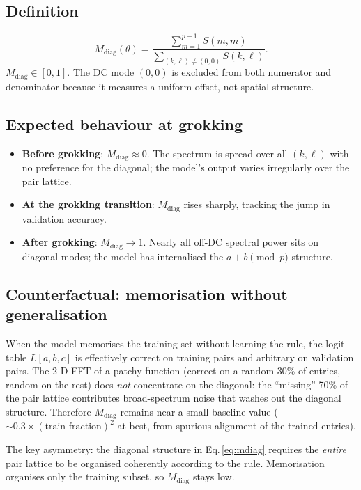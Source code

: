 \documentclass[11pt]{article}
\newcommand{\diag}{\mathrm{diag}}
\begin{document}
\subsection{Definition}

\begin{equation}
    M_{\diag}(\theta)
    = \frac{\displaystyle\sum_{m=1}^{p-1} S(m,m)}
           {\displaystyle\sum_{(k,\ell)\neq(0,0)} S(k,\ell)}.
    \label{eq:mdiag}
\end{equation}
$M_{\diag}\in[0,1]$.
The DC mode $(0,0)$ is excluded from both numerator and denominator because it
measures a uniform offset, not spatial structure.

\subsection{Expected behaviour at grokking}

\begin{itemize}
    \item \textbf{Before grokking}: $M_{\diag}\approx 0$.
    The spectrum is spread over all $(k,\ell)$ with no preference for the
    diagonal; the model's output varies irregularly over the pair lattice.
    \item \textbf{At the grokking transition}: $M_{\diag}$ rises sharply,
    tracking the jump in validation accuracy.
    \item \textbf{After grokking}: $M_{\diag}\to 1$.
    Nearly all off-DC spectral power sits on diagonal modes; the model has
    internalised the $a+b \pmod{p}$ structure.
\end{itemize}

\subsection{Counterfactual: memorisation without generalisation}

When the model memorises the training set without learning the rule,
the logit table $L[a,b,c]$ is effectively correct on training pairs and
arbitrary on validation pairs.
The 2-D FFT of a patchy function (correct on a random 30\% of entries,
random on the rest) does \emph{not} concentrate on the diagonal: the
``missing'' 70\% of the pair lattice contributes broad-spectrum noise that
washes out the diagonal structure.
Therefore $M_{\diag}$ remains near a small baseline value ($\sim 0.3 \times
(\text{train fraction})^2$ at best, from spurious alignment of the trained
entries).

The key asymmetry: the diagonal structure in Eq.\,\eqref{eq:mdiag} requires
the \emph{entire} pair lattice to be organised coherently according to the
rule.
Memorisation organises only the training subset, so $M_{\diag}$ stays low.
\end{document}
